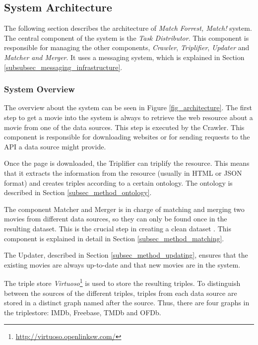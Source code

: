 \subsection{System Architecture}
\label{subsec_method_architecture}

The following section describes the architecture of \emph{Match Forrest, Match!} system.
The central component of the system is the \textit{Task Distributor}.
This component is responsible for managing the other components, \textit{Crawler}, \textit{Triplifier}, \textit{Updater} and \textit{Matcher and Merger}.
It uses a messaging system, which is explained in Section \ref{subsubsec_messaging_infrastructure}.

\subsubsection{System Overview}
\label{subsubsec_workflow}

The overview about the system can be seen in Figure \ref{fig_architecture}.
The first step to get a movie into the system is always to retrieve the web resource about a movie from one of the data sources.
This step is executed by the Crawler.
This component is responsible for downloading websites or for sending requests to the API a data source might provide.

Once the page is downloaded, the Triplifier can triplify the resource.
This means that it extracts the information from the resource (usually in HTML or JSON format) and creates triples according to a certain ontology.
The ontology is described in Section \ref{subsec_method_ontology}.

The component Matcher and Merger is in charge of matching and merging two movies from different data sources, so they can only be found once in the resulting dataset.
This is the crucial step in creating a clean dataset
.
This component is explained in detail in Section \ref{subsec_method_matching}.

The Updater, described in Section \ref{subsec_method_updating}, ensures that the existing movies are always up-to-date and that new movies are in the system.

The triple store \emph{Virtuoso}\footnote{\url{http://virtuoso.openlinksw.com/}} is used to store the resulting triples.
To distinguish between the sources of the different triples, triples from each data source are stored in a distinct graph named after the source.
Thus, there are four graphs in the triplestore: IMDb, Freebase, TMDb and OFDb.

